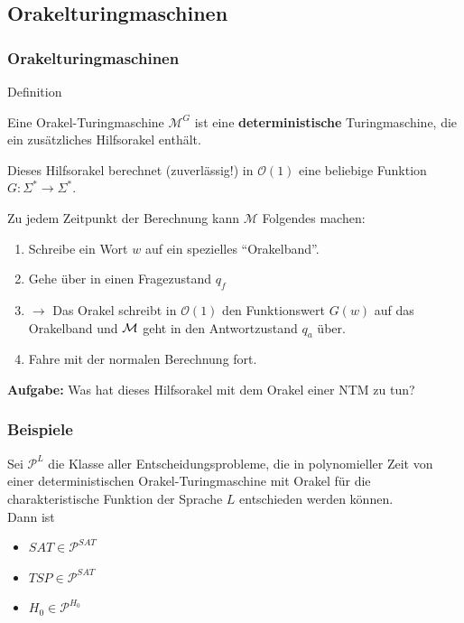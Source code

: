 \subsection{Orakelturingmaschinen}
\begin{frame}
\frametitle{Orakelturingmaschinen}
\begin{block}{Definition}

Eine Orakel-Turingmaschine $\mathcal{M}^G$ ist eine \textbf{deterministische} Turingmaschine, die ein zusätzliches Hilfsorakel enthält. \micropause

Dieses Hilfsorakel berechnet (zuverlässig!) in $\mathcal{O}(1)$ eine beliebige Funktion $G: \Sigma^* \rightarrow \Sigma^*$. \micropause

Zu jedem Zeitpunkt der Berechnung kann $\mathcal{M}$ Folgendes machen:
\begin{enumerate}
	\item Schreibe ein Wort $w$ auf ein spezielles "`Orakelband"'.
	\item Gehe über in einen Fragezustand $q_f$
	\item $\rightarrow$ Das Orakel schreibt in $\mathcal{O}(1)$ den Funktionswert $G(w)$ auf das Orakelband und $\mathcal{M}$ geht in den Antwortzustand $q_a$ über.
	\item Fahre mit der normalen Berechnung fort.
\end{enumerate} \micropause

\pause \textbf{Aufgabe:} Was hat dieses Hilfsorakel mit dem Orakel einer NTM zu tun? 


\end{block}
\end{frame}

\begin{frame}
\frametitle{Beispiele}
Sei $\mathcal{P}^L$ die Klasse aller Entscheidungsprobleme, die in polynomieller Zeit von einer deterministischen Orakel-Turingmaschine mit Orakel für die charakteristische Funktion der Sprache $L$ entschieden werden können.\\
Dann ist
\begin{itemize}
\item $SAT \in \mathcal{P}^{SAT}$
\item $TSP \in \mathcal{P}^{SAT}$ 
\item $H_0 \in \mathcal{P}^{H_0}$
\end{itemize}
\end{frame}


